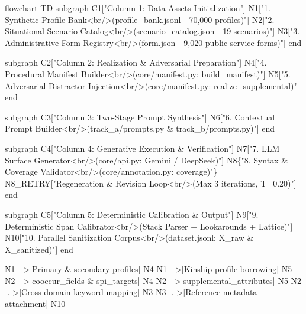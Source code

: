 \documentclass[
]{article}
\newenvironment{Shaded}{}{}
\newcommand{\NormalTok}[1]{#1}
\begin{document}
\begin{Shaded}
\begin{Highlighting}[]
\NormalTok{flowchart TD}
\NormalTok{    subgraph C1["Column 1: Data Assets Initialization"]}
\NormalTok{        N1["1. Synthetic Profile Bank\textless{}br/\textgreater{}(profile\_bank.jsonl {-} 70,000 profiles)"]}
\NormalTok{        N2["2. Situational Scenario Catalog\textless{}br/\textgreater{}(scenario\_catalog.json {-} 19 scenarios)"]}
\NormalTok{        N3["3. Administrative Form Registry\textless{}br/\textgreater{}(form.json {-} 9,020 public service forms)"]}
\NormalTok{    end}

\NormalTok{    subgraph C2["Column 2: Realization \& Adversarial Preparation"]}
\NormalTok{        N4["4. Procedural Manifest Builder\textless{}br/\textgreater{}(core/manifest.py: build\_manifest)"]}
\NormalTok{        N5["5. Adversarial Distractor Injection\textless{}br/\textgreater{}(core/manifest.py: realize\_supplemental)"]}
\NormalTok{    end}

\NormalTok{    subgraph C3["Column 3: Two{-}Stage Prompt Synthesis"]}
\NormalTok{        N6["6. Contextual Prompt Builder\textless{}br/\textgreater{}(track\_a/prompts.py \& track\_b/prompts.py)"]}
\NormalTok{    end}

\NormalTok{    subgraph C4["Column 4: Generative Execution \& Verification"]}
\NormalTok{        N7["7. LLM Surface Generator\textless{}br/\textgreater{}(core/api.py: Gemini / DeepSeek)"]}
\NormalTok{        N8\{"8. Syntax \& Coverage Validator\textless{}br/\textgreater{}(core/annotation.py: coverage)"\}}
\NormalTok{        N8\_RETRY["Regeneration \& Revision Loop\textless{}br/\textgreater{}(Max 3 iterations, T=0.20)"]}
\NormalTok{    end}

\NormalTok{    subgraph C5["Column 5: Deterministic Calibration \& Output"]}
\NormalTok{        N9["9. Deterministic Span Calibrator\textless{}br/\textgreater{}(Stack Parser + Lookarounds + Lattice)"]}
\NormalTok{        N10["10. Parallel Sanitization Corpus\textless{}br/\textgreater{}(dataset.jsonl: X\_raw \& X\_sanitized)"]}
\NormalTok{    end}

\NormalTok{    N1 {-}{-}\textgreater{}|Primary \& secondary profiles| N4}
\NormalTok{    N1 {-}{-}\textgreater{}|Kinship profile borrowing| N5}
\NormalTok{    N2 {-}{-}\textgreater{}|cooccur\_fields \& spi\_targets| N4}
\NormalTok{    N2 {-}{-}\textgreater{}|supplemental\_attributes| N5}
\NormalTok{    N2 {-}.{-}\textgreater{}|Cross{-}domain keyword mapping| N3}
\NormalTok{    N3 {-}.{-}\textgreater{}|Reference metadata attachment| N10}


\end{Highlighting}
\end{Shaded}
\end{document}
